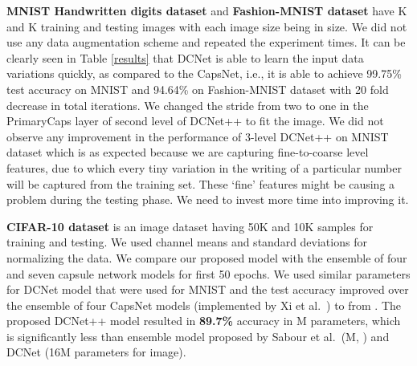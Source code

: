 \documentclass{bmvc2k}
\begin{document}
\textbf{MNIST Handwritten digits dataset} and \textbf{Fashion-MNIST dataset} have K and K training and testing images with each image size being  in size. We did not use any data augmentation scheme and repeated the experiment  times. It can be clearly seen in Table \ref{results} that DCNet is able to learn the input data variations quickly, as compared to the CapsNet, i.e., it is able to achieve 99.75\% test accuracy on MNIST and 94.64\% on Fashion-MNIST dataset with 20 fold decrease in total iterations. We changed the stride from two to one in the PrimaryCaps layer of second level of DCNet++ to fit the image. We did not observe any improvement in the  performance of 3-level DCNet++ on MNIST dataset which is as expected because we are capturing fine-to-coarse level features, due to which every tiny variation in the writing of a particular number will be captured from the training set. These `fine' features might be causing a problem during the testing phase. We need to invest more time into improving it.

\textbf{CIFAR-10 dataset} is an image dataset having 50K and 10K samples for training and testing. We used channel means and standard deviations for normalizing the data. We compare our proposed model with the ensemble of four and seven capsule network models \cite{capsnet} for first 50 epochs. We used similar parameters for DCNet model that were used for MNIST and the test accuracy improved over the ensemble of four CapsNet models (implemented by Xi et al.\ \cite{complexdata}) to  from  . The proposed DCNet++ model resulted in \textbf{89.7\%} accuracy in M parameters, which is significantly less than  ensemble model proposed by Sabour et al.\ (M, )  and DCNet (16M parameters for  image).
  
\end{document}

